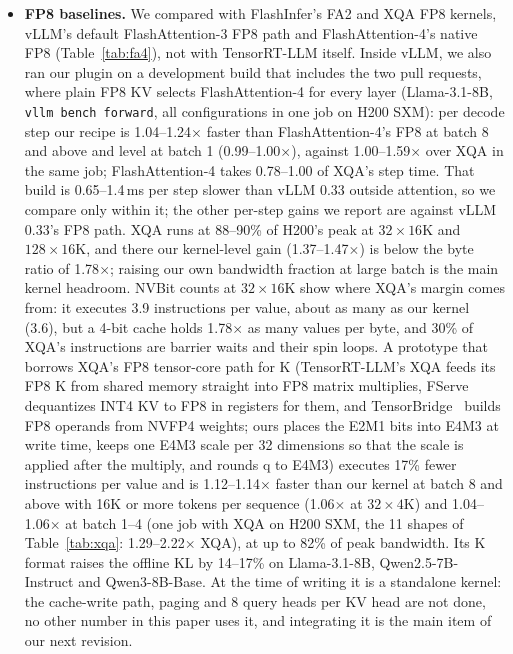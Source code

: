 \documentclass[11pt]{article}
\begin{document}
\begin{itemize}
  \item \textbf{FP8 baselines.} We compared with FlashInfer's FA2 and XQA FP8 kernels, vLLM's default FlashAttention-3 FP8 path and FlashAttention-4's native FP8 (Table~\ref{tab:fa4}), not with TensorRT-LLM itself. Inside vLLM, we also ran our plugin on a development build that includes the two pull requests, where plain FP8 KV selects FlashAttention-4 for every layer (Llama-3.1-8B, \texttt{vllm bench forward}, all configurations in one job on H200 SXM): per decode step our recipe is 1.04--1.24$\times$ faster than FlashAttention-4's FP8 at batch 8 and above and level at batch 1 (0.99--1.00$\times$), against 1.00--1.59$\times$ over XQA in the same job; FlashAttention-4 takes 0.78--1.00 of XQA's step time. That build is 0.65--1.4\,ms per step slower than vLLM 0.33 outside attention, so we compare only within it; the other per-step gains we report are against vLLM 0.33's FP8 path. XQA runs at 88--90\% of H200's peak at $32 \times 16$K and $128 \times 16$K, and there our kernel-level gain (1.37--1.47$\times$) is below the byte ratio of 1.78$\times$; raising our own bandwidth fraction at large batch is the main kernel headroom. NVBit counts at $32 \times 16$K show where XQA's margin comes from: it executes 3.9 instructions per value, about as many as our kernel (3.6), but a 4-bit cache holds 1.78$\times$ as many values per byte, and 30\% of XQA's instructions are barrier waits and their spin loops. A prototype that borrows XQA's FP8 tensor-core path for K (TensorRT-LLM's XQA feeds its FP8 K from shared memory straight into FP8 matrix multiplies, FServe~\cite{baek2026fserve} dequantizes INT4 KV to FP8 in registers for them, and TensorBridge~\cite{zou2026tensorbridge} builds FP8 operands from NVFP4 weights; ours places the E2M1 bits into E4M3 at write time, keeps one E4M3 scale per 32 dimensions so that the scale is applied after the multiply, and rounds q to E4M3) executes 17\% fewer instructions per value and is 1.12--1.14$\times$ faster than our kernel at batch 8 and above with 16K or more tokens per sequence (1.06$\times$ at $32 \times 4$K) and 1.04--1.06$\times$ at batch 1--4 (one job with XQA on H200 SXM, the 11 shapes of Table~\ref{tab:xqa}: 1.29--2.22$\times$ XQA), at up to 82\% of peak bandwidth. Its K format raises the offline KL by 14--17\% on Llama-3.1-8B, Qwen2.5-7B-Instruct and Qwen3-8B-Base. At the time of writing it is a standalone kernel: the cache-write path, paging and 8 query heads per KV head are not done, no other number in this paper uses it, and integrating it is the main item of our next revision.

\end{itemize}
\end{document}
